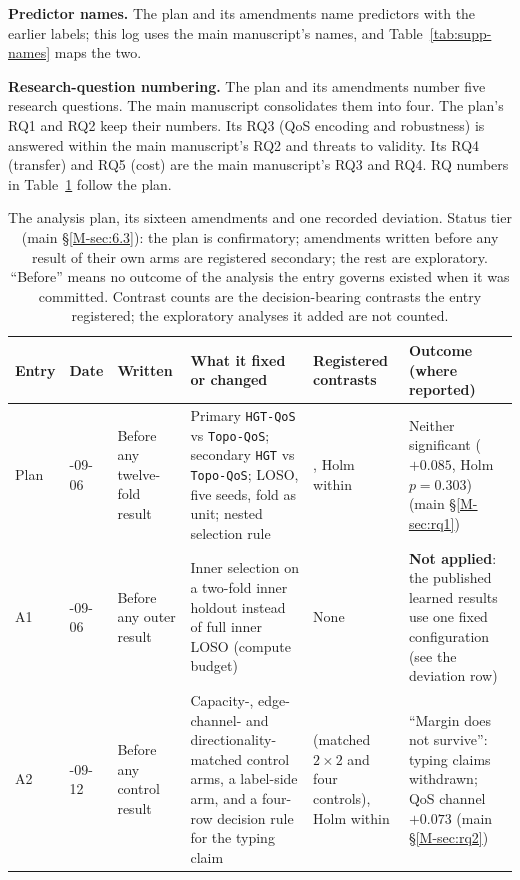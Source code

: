 \documentclass[preprint,3p]{elsarticle}
\begin{document}
\noindent\textbf{Predictor names.} The plan and its amendments name predictors with the earlier labels; this log uses the main manuscript's names, and Table~\ref{tab:supp-names} maps the two.

\noindent\textbf{Research-question numbering.} The plan and its amendments number five research questions. The main manuscript consolidates them into four. The plan's RQ1 and RQ2 keep their numbers. Its RQ3 (QoS encoding and robustness) is answered within the main manuscript's RQ2 and threats to validity. Its RQ4 (transfer) and RQ5 (cost) are the main manuscript's RQ3 and RQ4. RQ numbers in Table~\ref{tab:supp-amendments} follow the plan.

\begin{table}[htbp]
\centering
\scriptsize
\caption{The analysis plan, its sixteen amendments and one recorded deviation. Status tier (main \S\ref{M-sec:6.3}): the plan is confirmatory; amendments written before any result of their own arms are registered secondary; the rest are exploratory. ``Before'' means no outcome of the analysis the entry governs existed when it was committed. Contrast counts are the decision-bearing contrasts the entry registered; the exploratory analyses it added are not counted.}
\label{tab:supp-amendments}
\begin{tabular}{>{\raggedright\arraybackslash}p{0.9cm}>{\raggedright\arraybackslash}p{1.35cm}>{\raggedright\arraybackslash}p{1.6cm}>{\raggedright\arraybackslash}p{4.3cm}>{\raggedright\arraybackslash}p{1.9cm}>{\raggedright\arraybackslash}p{3.4cm}}
\toprule
\textbf{Entry} & \textbf{Date} & \textbf{Written} & \textbf{What it fixed or changed} & \textbf{Registered contrasts} & \textbf{Outcome (where reported)} \\
\midrule
Plan & 2026-09-06 & Before any twelve-fold result & Primary \texttt{HGT-QoS} vs \texttt{Topo-QoS}; secondary \texttt{HGT} vs \texttt{Topo-QoS}; LOSO, five seeds, fold as unit; nested selection rule & 2, Holm within & Neither significant ($+0.085$, Holm $p = 0.303$) (main \S\ref{M-sec:rq1}) \\
A1 & 2026-09-06 & Before any outer result & Inner selection on a two-fold inner holdout instead of full inner LOSO (compute budget) & None & \textbf{Not applied}: the published learned results use one fixed configuration (see the deviation row) \\
A2 & 2026-09-12 & Before any control result & Capacity-, edge-channel- and directionality-matched control arms, a label-side arm, and a four-row decision rule for the typing claim & 7 (matched $2\times2$ and four controls), Holm within & ``Margin does not survive'': typing claims withdrawn; QoS channel $+0.073$ (main \S\ref{M-sec:rq2}) \\

\end{tabular}
\end{table}
\end{document}
